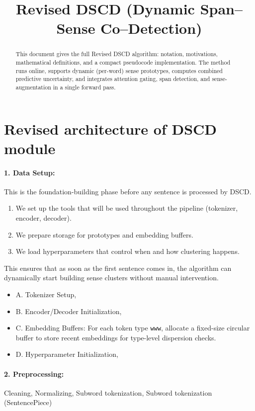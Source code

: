 \documentclass[a4paper,12pt]{article}
\begin{document}
\title{Revised DSCD (Dynamic Span--Sense Co--Detection)}
\author{}
\date{}
\maketitle

\begin{abstract}
This document gives the full Revised DSCD algorithm: notation, motivations, mathematical definitions, and a compact pseudocode implementation. The method runs online, supports dynamic (per-word) sense prototypes, computes combined predictive uncertainty, and integrates attention gating, span detection, and sense-augmentation in a single forward pass.
\end{abstract}

\section*{Revised architecture of DSCD module}

\paragraph{1. Data Setup:} This is the foundation-building phase before any sentence is processed by DSCD.
\begin{enumerate}
    \item We set up the tools that will be used throughout the pipeline (tokenizer, encoder, decoder).
    \item We prepare storage for prototypes and embedding buffers.
    \item We load hyperparameters that control when and how clustering happens.
\end{enumerate}
This ensures that as soon as the first sentence comes in, the algorithm can dynamically start building sense clusters without manual intervention.

\begin{itemize}
    \item A. Tokenizer Setup,
    \item B. Encoder/Decoder Initialization,
    \item C. Embedding Buffers: For each token type \texttt{www}, allocate a fixed-size circular buffer to store recent embeddings for type-level dispersion checks.
    \item D. Hyperparameter Initialization,
\end{itemize}

\paragraph{2. Preprocessing:} Cleaning, Normalizing, Subword tokenization, Subword tokenization (SentencePiece)
\end{document}
